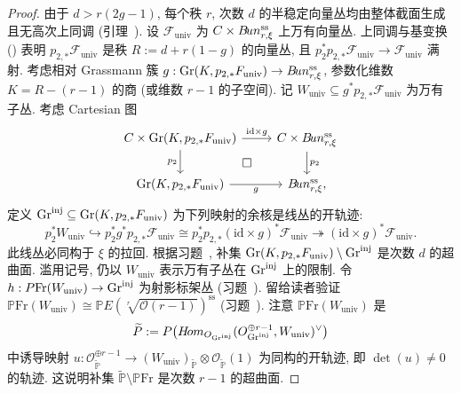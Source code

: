 \begin{proof}
由于 $d>r(2g-1)$, 每个秩 $r$, 次数 $d$ 的半稳定向量丛均由整体截面生成且无高次上同调 (引理~). 设 $\mathcal F_{\mathrm{univ}}$ 为 $C\times B\!un_{r,\xi}^{\mathrm{ss}}$ 上万有向量丛. 上同调与基变换 () 表明 $p_{2,*}\mathcal F_{\mathrm{univ}}$ 是秩 $R:=d+r(1-g)$ 的向量丛, 且 $p_2^*p_{2,*}\mathcal F_{\mathrm{univ}}\to\mathcal F_{\mathrm{univ}}$ 满射. 考虑相对 Grassmann 簇 $g:\operatorname{Gr}(K,p_{2,*}F_{\mathrm{univ}})\to B\!un_{r,\xi}^{\mathrm{ss}}$, 参数化维数 $K=R-(r-1)$ 的商 (或维数 $r-1$ 的子空间). 记 $W_{\mathrm{univ}}\subseteq g^*p_{2,*}\mathcal F_{\mathrm{univ}}$ 为万有子丛. 考虑 Cartesian 图
\[
\begin{tikzcd}[ampersand replacement=\&]
C\times\Gr(K,p_{2,*}\mathcal F_{\mathrm{univ}})\arrow[r,"\mathrm{id}\times g"]\arrow[d,"p_2"']\& C\times\cBun_{r,\xi}^{\mathrm{ss}}\arrow[d,"p_2"]\\
\Gr(K,p_{2,*}\mathcal F_{\mathrm{univ}})\arrow[r,"g"']\&\cBun_{r,\xi}^{\mathrm{ss}}\arrow[ul,phantom,"\square"],
\end{tikzcd}
\]
定义 $\operatorname{Gr}^{\mathrm{inj}}\subseteq\operatorname{Gr}(K,p_{2,*}F_{\mathrm{univ}})$ 为下列映射的余核是线丛的开轨迹:
\[
p_2^*W_{\mathrm{univ}}\hookrightarrow p_2^*g^*p_{2,*}\mathcal F_{\mathrm{univ}}\cong p_2^*p_{2,*}(\mathrm{id}\times g)^*\mathcal F_{\mathrm{univ}}\twoheadrightarrow(\mathrm{id}\times g)^*\mathcal F_{\mathrm{univ}}.
\]
此线丛必同构于 $\xi$ 的拉回. 根据习题~, 补集 $\operatorname{Gr}(K,p_{2,*}F_{\mathrm{univ}})\setminus\operatorname{Gr}^{\mathrm{inj}}$ 是次数 $d$ 的超曲面. 滥用记号, 仍以 $W_{\mathrm{univ}}$ 表示万有子丛在 $\operatorname{Gr}^{\mathrm{inj}}$ 上的限制. 令 $h:P\mathrm{Fr}(W_{\mathrm{univ}})\to\operatorname{Gr}^{\mathrm{inj}}$ 为射影标架丛 (习题~). 留给读者验证 $\mathbb P\mathrm{Fr}(W_{\mathrm{univ}})\cong\mathbb PE(\sqrt[r]{\mathcal O(r-1)})^{\mathrm{ss}}$ (习题~). 注意 $\mathbb P\mathrm{Fr}(W_{\mathrm{univ}})$ 是
\[
\widetilde{P}:=P\big(H\!om_{O_{\operatorname{Gr}^{\mathrm{inj}}}}(O_{\operatorname{Gr}^{\mathrm{inj}}}^{\oplus r-1},W_{\mathrm{univ}})^\vee\big)
\]
中诱导映射 $u:\mathcal O_{\widetilde{\mathbb P}}^{\oplus r-1}\to(W_{\mathrm{univ}})_{\widetilde{\mathbb P}}\otimes\mathcal O_{\widetilde{\mathbb P}}(1)$ 为同构的开轨迹, 即 $\det(u)\neq0$ 的轨迹. 这说明补集 $\widetilde{\mathbb P}\setminus\mathbb P\mathrm{Fr}$ 是次数 $r-1$ 的超曲面.


\end{proof}
